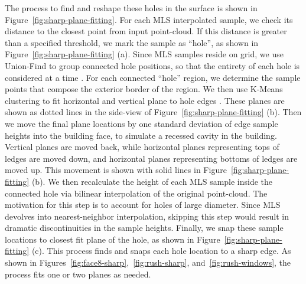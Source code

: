 \documentclass{article}
\begin{document}
The process to find and reshape these holes in the surface is shown in Figure~\ref{fig:sharp-plane-fitting}.  For each MLS interpolated sample, we check its distance to the closest point from input point-cloud.  If this distance is greater than a specified threshold, we mark the sample as ``hole'', as shown in Figure~\ref{fig:sharp-plane-fitting} (a).  Since MLS samples reside on grid, we use Union-Find to group connected hole positions, so that the entirety of each hole is considered at a time \cite{Doyle76}. For each connected ``hole'' region, we determine the sample points that compose the exterior border of the region. We then use K-Means clustering to fit horizontal and vertical plane to hole edges \cite{Lloyd57}.  These planes are shown as dotted lines in the side-view of Figure~\ref{fig:sharp-plane-fitting} (b).  Then we move the final plane locations by one standard deviation of edge sample heights into the building face, to simulate a recessed cavity in the building.  Vertical planes are moved back, while horizontal planes representing tops of ledges are moved down, and horizontal planes representing bottoms of ledges are moved up.  This movement is shown with solid lines in Figure~\ref{fig:sharp-plane-fitting} (b).  We then recalculate the height of each MLS sample inside the connected hole via bilinear interpolation of the original point-cloud.  The motivation for this step is to account for holes of large diameter.  Since MLS devolves into nearest-neighbor interpolation, skipping this step would result in dramatic discontinuities in the sample heights.  Finally, we snap these sample locations to closest fit plane of the hole, as shown in Figure~\ref{fig:sharp-plane-fitting} (c). This process finds and snaps each hole location to a sharp edge.  As shown in Figures~\ref{fig:face8-sharp},~\ref{fig:rush-sharp}, and~\ref{fig:rush-windows}, the process fits one or two planes as needed.


%
%
\end{document}
